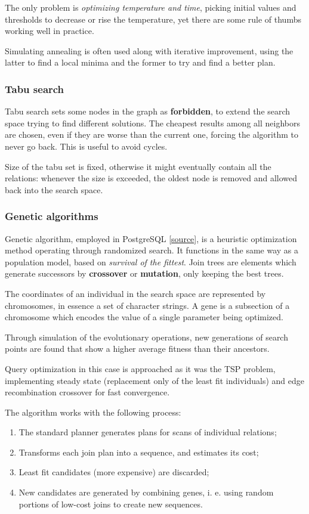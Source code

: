 The only problem is \textit{optimizing temperature and time}, picking initial values and thresholds to decrease or rise the temperature, yet there are some rule of thumbs working well in practice.

Simulating annealing is often used along with iterative improvement, using the latter to find a local minima and the former to try and find a better plan.

\subsubsection{Tabu search}
Tabu search sets some nodes in the graph as \textbf{forbidden}, to extend the search space trying to find different solutions. The cheapest results among all neighbors are chosen, even if they are worse than the current one, forcing the algorithm to never go back. This is useful to avoid cycles.  

Size of the tabu set is fixed, otherwise it might eventually contain all the relations: whenever the size is exceeded, the oldest node is removed and allowed back into the search space. 

\subsubsection{Genetic algorithms}
Genetic algorithm, employed in PostgreSQL [\href{https://www.postgresql.org/docs/current/geqo.html}{source}], is a heuristic optimization method operating through randomized search. It functions in the same way as a population model, based on \textit{survival of the fittest}. Join trees are elements which generate successors by \textbf{crossover} or \textbf{mutation}, only keeping the best trees.

The coordinates of an individual in the search space are represented by chromosomes, in essence a set of character strings. A gene is a subsection of a chromosome which encodes the value of a single parameter being optimized.

Through simulation of the evolutionary operations, new generations of search points are found that show a higher average fitness than their ancestors. 

Query optimization in this case is approached as it was the TSP problem, implementing steady state (replacement only of the least fit individuals) and edge recombination crossover for fast convergence. 

The algorithm works with the following process:
\begin{enumerate}
	\item The standard planner generates plans for scans of individual relations;
	\item Transforms each join plan into a sequence, and estimates its cost;
	\item Least fit candidates (more expensive) are discarded;
	\item New candidates are generated by combining genes, i. e. using random portions of low-cost joins to create new sequences.
\end{enumerate}

